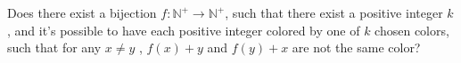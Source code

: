 Does there exist a bijection $f:\mathbb{N}^{+} \rightarrow \mathbb{N}^{+}$, such that there exist a positive integer $k$, and it's possible to have each positive integer colored by one of $k$ chosen colors, such that for any $x \neq y$ , $f(x)+y$ and $f(y)+x$ are not the same color?